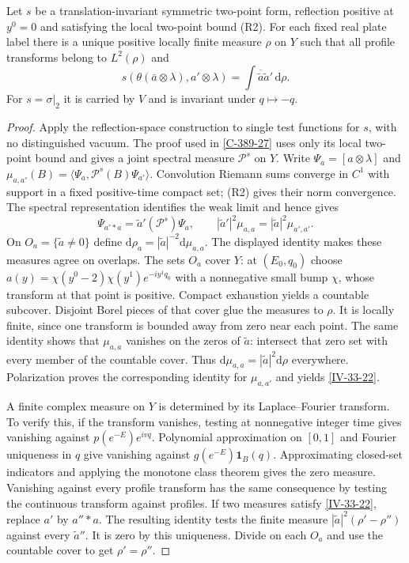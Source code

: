\documentclass[11pt,letterpaper,reqno]{amsart}
\makeatletter
\theoremstyle{definition}
\newcommand{\ms@minorstart}{%
  \pushQED{\qed}\renewcommand{\qedsymbol}{$\blacksquare$}}
\newenvironment{proposition}[1][]{\ms@minorstart\ms@proposition[#1]}
  {\popQED\endms@proposition}
\theoremstyle{remark}
\makeatother
\begin{document}
\begin{proposition}[The plate measure]\label{IV-33-21}
Let $s$ be a translation-invariant symmetric two-point form,
reflection positive at $y^0=0$ and satisfying the local
two-point bound (R2). For each fixed real plate label there
is a unique positive locally finite measure $\rho$ on $Y$
such that all profile transforms belong to $L^2(\rho)$ and
\begin{equation}\label{IV-33-22}
 s(\theta(\bar a\otimes\lambda),a'\otimes\lambda)
             =\int\overline{\widetilde a}\widetilde a'
                                                     \,\mathrm{d}\rho.
\end{equation}
For $s=\sigma|_2$ it is carried by $V$ and is invariant
under $q\mapsto-q$.
\end{proposition}
\begin{proof}
Apply the reflection-space construction to single test
functions for $s$, with no distinguished vacuum. The proof
used in \cref{C-389-27} uses only its local two-point bound
and gives a joint spectral measure $\mathcal P^s$ on $Y$.
Write $\Psi_a=[a\otimes\lambda]$ and
$\mu_{a,a'}(B)=\langle\Psi_a,\mathcal P^s(B)\Psi_{a'}\rangle$.
Convolution Riemann sums converge in $C^1$ with support in
a fixed positive-time compact set; (R2) gives their norm
convergence. The spectral representation identifies the
weak limit and hence gives
\[
 \Psi_{a'*a}=\widetilde a'(\mathcal P^s)\Psi_a,\qquad
 |\widetilde a'|^2\mu_{a,a}
                  =|\widetilde a|^2\mu_{a',a'}.
\]
On $O_a=\{\widetilde a\ne0\}$ define
$\mathrm{d}\rho_a=|\widetilde a|^{-2}\mathrm{d}\mu_{a,a}$.
The displayed identity makes these measures agree on
overlaps. The sets $O_a$ cover $Y$: at $(E_0,q_0)$ choose
$a(y)=\chi(y^0-2)\chi(y^1)e^{-iy^1q_0}$ with a nonnegative
small bump $\chi$, whose transform at that point is positive.
Compact exhaustion yields a countable subcover. Disjoint
Borel pieces of that cover glue the measures to $\rho$.
It is locally finite, since one transform is bounded away
from zero near each point. The same identity shows that
$\mu_{a,a}$ vanishes on the zeros of $\widetilde a$:
intersect that zero set with every member of the countable
cover. Thus $\mathrm{d}\mu_{a,a}=|\widetilde a|^2\mathrm{d}\rho$
everywhere. Polarization proves the corresponding identity
for $\mu_{a,a'}$ and yields \eqref{IV-33-22}.

A finite complex measure on $Y$ is determined by its
Laplace--Fourier transform. To verify this, if the transform
vanishes, testing at nonnegative integer time gives
vanishing against $p(e^{-E})e^{ivq}$. Polynomial
approximation on $[0,1]$ and Fourier uniqueness in $q$
give vanishing against $g(e^{-E})\mathbf1_B(q)$.
Approximating closed-set indicators and applying the
monotone class theorem gives the zero measure.
Vanishing against every profile transform has the same
consequence by testing the continuous transform against
profiles. If two measures satisfy \eqref{IV-33-22}, replace
$a'$ by $a''*a$. The resulting identity tests the finite
measure $|\widetilde a|^2(\rho'-\rho'')$ against every
$\widetilde a''$. It is zero by this uniqueness. Divide
on each $O_a$ and use the countable cover to get
$\rho'=\rho''$.


\end{proof}
\end{document}
